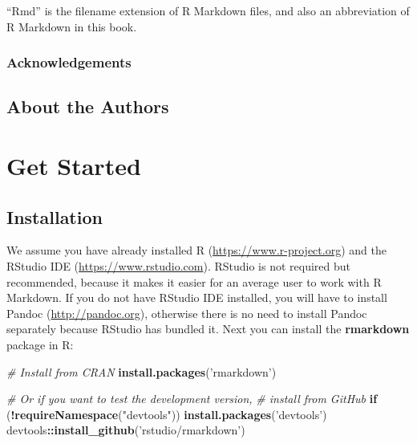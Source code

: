 \documentclass[]{book}
\newenvironment{Shaded}{\begin{snugshade}}{\end{snugshade}}
\newcommand{\CommentTok}[1]{\textcolor[rgb]{0.56,0.35,0.01}{\textit{#1}}}
\newcommand{\ControlFlowTok}[1]{\textcolor[rgb]{0.13,0.29,0.53}{\textbf{#1}}}
\newcommand{\KeywordTok}[1]{\textcolor[rgb]{0.13,0.29,0.53}{\textbf{#1}}}
\newcommand{\NormalTok}[1]{#1}
\newcommand{\OperatorTok}[1]{\textcolor[rgb]{0.81,0.36,0.00}{\textbf{#1}}}
\newcommand{\StringTok}[1]{\textcolor[rgb]{0.31,0.60,0.02}{#1}}
\theoremstyle{definition}
\theoremstyle{definition}
\theoremstyle{definition}
\theoremstyle{remark}
\begin{document}
``Rmd'' is the filename extension of R Markdown files, and also an
abbreviation of R Markdown in this book.

\hypertarget{acknowledgements}{%
\section*{Acknowledgements}\label{acknowledgements}}

\hypertarget{author}{%
\chapter*{About the Authors}\label{author}}

\mainmatter

\hypertarget{part-get-started}{%
\part{Get Started}\label{part-get-started}}

\hypertarget{installation}{%
\chapter{Installation}\label{installation}}

We assume you have already installed R (\url{https://www.r-project.org})
\citep{R-base} and the RStudio IDE (\url{https://www.rstudio.com}).
RStudio is not required but recommended, because it makes it easier for
an average user to work with R Markdown. If you do not have RStudio IDE
installed, you will have to install Pandoc
(\url{http://pandoc.org}), otherwise there is no need to install Pandoc
separately because RStudio has bundled it. Next you can install the
\textbf{rmarkdown} package in R:

\begin{Shaded}
\begin{Highlighting}[]
\CommentTok{# Install from CRAN}
\KeywordTok{install.packages}\NormalTok{(}\StringTok{'rmarkdown'}\NormalTok{)}

\CommentTok{# Or if you want to test the development version,}
\CommentTok{# install from GitHub}
\ControlFlowTok{if}\NormalTok{ (}\OperatorTok{!}\KeywordTok{requireNamespace}\NormalTok{(}\StringTok{"devtools"}\NormalTok{))}
  \KeywordTok{install.packages}\NormalTok{(}\StringTok{'devtools'}\NormalTok{)}
\NormalTok{devtools}\OperatorTok{::}\KeywordTok{install_github}\NormalTok{(}\StringTok{'rstudio/rmarkdown'}\NormalTok{)}
\end{Highlighting}
\end{Shaded}
\end{document}

